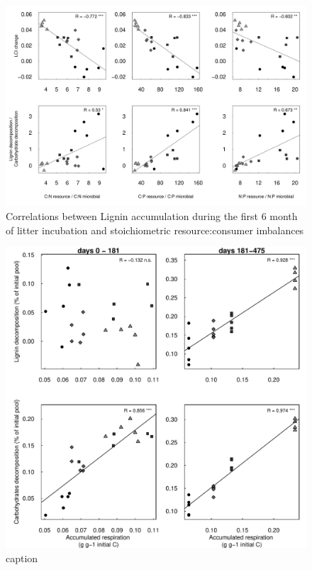 \documentclass[authoryear,preprint,review,12pt]{elsarticle}
\begin{document}
\newpage
\begin{figure}[h!]
\vspace*{2mm}
\begin{center}
\includegraphics{sbb-graphcorr}
\end{center}
\caption{Correlations between Lignin accumulation during the first 6 month of litter incubation and stoichiometric resource:consumer imbalances}
\label{fig:cor1}
\end{figure}

\newpage
\begin{figure}[h!]
\vspace*{2mm}
\begin{center}
\includegraphics{sbb-respcorr}
\end{center}
\caption{caption}
\label{fig:repcor}
\end{figure}
\end{document}
